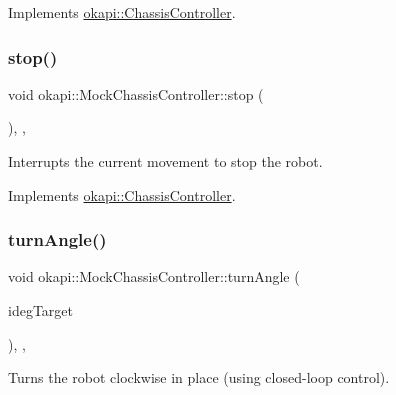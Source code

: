 Implements \mbox{\hyperlink{classokapi_1_1ChassisController_a37ae36ec8936272eb31e3baed7eed417}{okapi\+::\+Chassis\+Controller}}.

\mbox{\label{classokapi_1_1MockChassisController_ad447a57c58345fa98a1ee0504f71a8fe}} 
\subsubsection{\texorpdfstring{stop()}{stop()}}
{\footnotesize\ttfamily void okapi\+::\+Mock\+Chassis\+Controller\+::stop (\begin{DoxyParamCaption}{ }\end{DoxyParamCaption})\hspace{0.3cm}{\ttfamily [inline]}, {\ttfamily [override]}, {\ttfamily [virtual]}}



Interrupts the current movement to stop the robot. 



Implements \mbox{\hyperlink{classokapi_1_1ChassisController_ac67edbbbe1c8480c4503b9875a3719cd}{okapi\+::\+Chassis\+Controller}}.

\mbox{\label{classokapi_1_1MockChassisController_a26eea2286c67ead1e06f667cc47bbdaf}} 
\subsubsection{\texorpdfstring{turnAngle()}{turnAngle()}\hspace{0.1cm}{\footnotesize\ttfamily [1/2]}}
{\footnotesize\ttfamily void okapi\+::\+Mock\+Chassis\+Controller\+::turn\+Angle (\begin{DoxyParamCaption}\item[{Q\+Angle}]{ideg\+Target }\end{DoxyParamCaption})\hspace{0.3cm}{\ttfamily [inline]}, {\ttfamily [override]}, {\ttfamily [virtual]}}



Turns the robot clockwise in place (using closed-\/loop control). 


